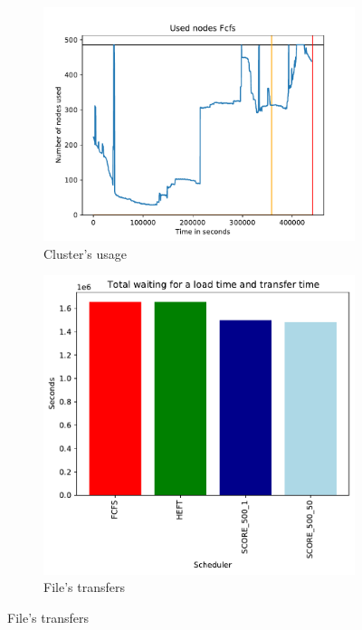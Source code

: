 \documentclass[a4paper]{article}
\begin{document}
\begin{figure}[H]\centering
\begin{subfigure}[b]{0.4\linewidth}\centering\includegraphics[width=1\linewidth]{MBSS/plot/2022-09-08->2022-09-08_V85105_Fcfs_Used_nodes_450_128_32_256_4_1024.pdf}\caption{Cluster's usage}\end{subfigure}
\begin{subfigure}[b]{0.4\linewidth}\centering\includegraphics[width=0.9\linewidth]{MBSS/plot/Results_FCFS_Score_Adaptative_Multiplier_2022-09-08->2022-09-08_V9271_Total_waiting_for_a_load_time_and_transfer_time_450_128_32_256_4_1024.pdf}\caption{File's transfers}\end{subfigure}

\end{figure}
\end{document}
